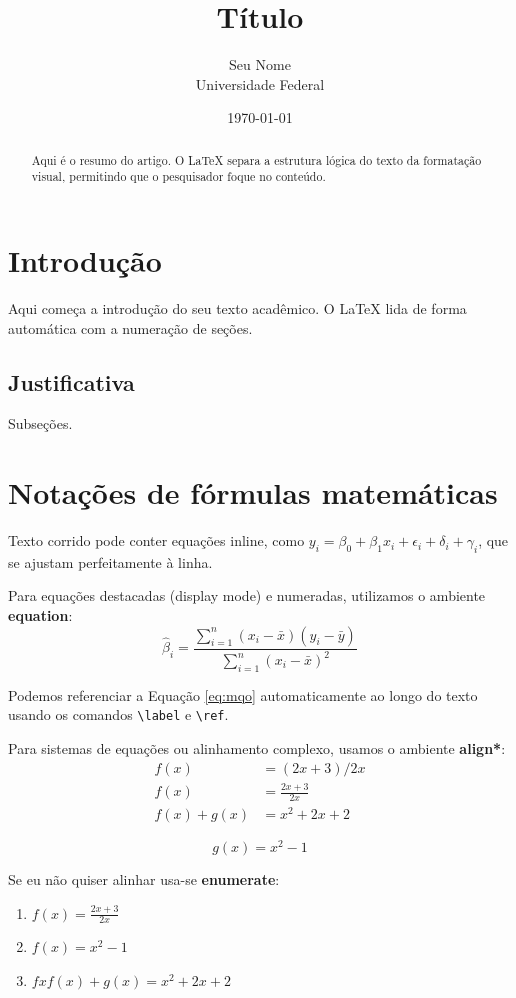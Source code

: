 \documentclass[12pt, a4paper]{article}
\title{Título}
\author{Seu Nome \\
\small Universidade Federal}
\date{\today}
\begin{document}
\maketitle %

\begin{abstract}
Aqui é o resumo do artigo. O LaTeX separa a estrutura lógica do texto da formatação visual, permitindo que o pesquisador foque no conteúdo.
\end{abstract}

\section{Introdução}
Aqui começa a introdução do seu texto acadêmico. O LaTeX lida de forma automática com a numeração de seções.

\subsection{Justificativa}
Subseções.

\section{Notações de fórmulas  matemáticas}

Texto corrido pode conter equações inline, como $y_i = \beta_0 + \beta_1 x_i + \epsilon_i + \delta_i +\gamma_i$, que se ajustam perfeitamente à linha.

Para equações destacadas (display mode) e numeradas, utilizamos o ambiente \textbf{equation}:
\begin{equation}
    \hat{\beta}_i = \frac{\sum_{i=1}^{n} (x_i - \bar{x})(y_i - \bar{y})}{\sum_{i=1}^{n} (x_i - \bar{x})^2}
    \label{eq:mqo}
\end{equation}

Podemos referenciar a Equação \ref{eq:mqo} automaticamente ao longo do texto usando os comandos \texttt{\textbackslash label} e \texttt{\textbackslash ref}.

Para sistemas de equações ou alinhamento complexo, usamos o ambiente \textbf{align*}:
\begin{align*}
    f(x) &= (2x + 3)/2x \\
    f(x) &=\frac{2x+3}{2x} \\
    f(x) + g(x) &= x^2 + 2x + 2
\end{align*}

    \[g(x)= x^2 - 1\]

Se eu não quiser alinhar usa-se \textbf{enumerate}: \\

\begin{enumerate}
\item[A)] $f(x)=\frac{2x+3}{2x}$ \\
\item[B)] $f(x)=x^2 - 1$ \\
\item [C)] $fxf(x) + g(x)= x^2 + 2x + 2$


\end{enumerate}
\end{document}
